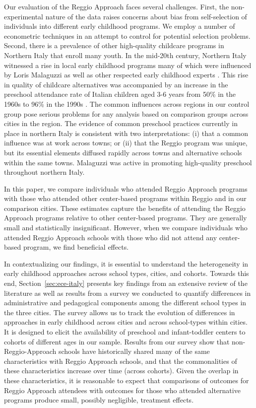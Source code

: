 Our evaluation of the Reggio Approach faces several challenges. First, the non-experimental nature of the data raises concerns about bias from self-selection of individuals into different early childhood programs. We employ a number of econometric techniques in an attempt to control for potential selection problems. Second, there is a prevalence of other high-quality childcare programs in Northern Italy that enroll many youth. In the mid-20th century, Northern Italy witnessed a rise in local early childhood programs many of which were influenced by Loris Malaguzzi as well as other respected early childhood experts \citep{OECD_2001_Italy-Country-Note}. This rise in quality of childcare alternatives was accompanied by an increase in the preschool attendance rate of Italian children aged 3-6 years from 50\% in the 1960s to 96\% in the 1990s \citep{Hohnerlein_2015_Development-and-Diffusion}. The common influences across regions in our control group pose serious problems for any analysis based on comparison groups across cities in the region.  The evidence of common preschool practices currently in place in northern Italy is consistent with two interpretations: (i) that a common influence was at work across towns; or (ii) that the Reggio program was unique, but its essential elements diffused rapidly across towns and alternative schools within the same towns. Malaguzzi was active in promoting high-quality preschool throughout northern Italy.

In this paper, we compare individuals who attended Reggio Approach programs with those who attended other center-based programs within Reggio and in our comparison cities. These estimates capture the benefits of attending the Reggio Approach programs relative to other center-based programs. They are generally small and statistically insignificant. However, when we compare individuals who attended Reggio Approach schools with those who did not attend any center-based program, we find beneficial effects.

In contextualizing our findings, it is essential to understand the heterogeneity in early childhood approaches across school types, cities, and cohorts. Towards this end, Section~\ref{sec:ece-italy} presents key findings from an extensive review of the literature as well as results from a survey we conducted to quantify differences in administrative and pedagogical components among the different school types in the three cities. The survey allows us to track the evolution of differences in approaches in early childhood across cities and across school-types within cities. It is designed to elicit the availability of preschool and infant-toddler centers to cohorts of different ages in our sample. Results from our survey show that non-Reggio-Approach schools have historically shared many of the same characteristics with Reggio Approach schools, and that the commonalities of these characteristics increase over time (across cohorts). Given the overlap in these characteristics, it is reasonable to expect that comparisons of outcomes for Reggio Approach attendees with outcomes for those who attended alternative programs produce small, possibly negligible, treatment effects.

